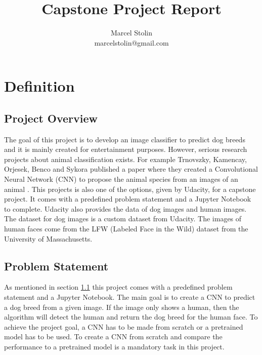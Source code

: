 \documentclass{article}
\title{Capstone Project Report}
\date{}
\author{Marcel Stolin \\ marcelstolin@gmail.com}
\begin{document}
\maketitle

\section{Definition} \label{s_definition}

\subsection{Project Overview} \label{su_project_overview}
The goal of this project is to develop an image classifier to predict dog breeds and it is mainly created for entertainment purposes. However, serious research projects about animal classification exists. For example Trnovszky, Kamencay, Orjesek, Benco and Sykora published a paper where they created a Convolutional Neural Network (CNN) to propose the animal species from an images of an animal \cite{animal_rec}.\newline
This projects is also one of the options, given by Udacity, for a capstone project. It comes with a predefined problem statement and a Jupyter Notebook to complete. Udacity also provides the data of dog images and human images. The dataset for dog images is a custom dataset from Udacity. The images of human faces come from the LFW (Labeled Face in the Wild) \cite{lfw} dataset from the University of Massachusetts.

\subsection{Problem Statement} \label{su_problem_statement}
As mentioned in section \ref{su_project_overview} this project comes with a predefined problem statement and a Jupyter Notebook. The main goal is to create a CNN to predict a dog breed from a given image. If the image only shows a human, then the algorithm will detect the human and return the dog breed for the human face. To achieve the project goal, a CNN has to be made from scratch or a pretrained model has to be used. To create a CNN from scratch and compare the performance to a pretrained model is a mandatory task in this project.\newline
\end{document}
